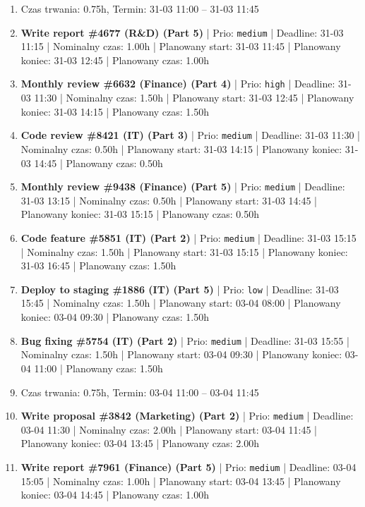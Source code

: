 {\begin{enumerate}
  \item [\textbf{PRZERWA}] Czas trwania: 0.75h, Termin: 31-03 11:00 -- 31-03 11:45
  \item [\textbf{14640}] \textbf{Write report \#4677 (R\&D) (Part 5)} | Prio: \texttt{medium} | Deadline: 31-03 11:15 | Nominalny czas: 1.00h | Planowany start: 31-03 11:45 | Planowany koniec: 31-03 12:45 | Planowany czas: 1.00h
  \item [\textbf{14615}] \textbf{Monthly review \#6632 (Finance) (Part 4)} | Prio: \texttt{high} | Deadline: 31-03 11:30 | Nominalny czas: 1.50h | Planowany start: 31-03 12:45 | Planowany koniec: 31-03 14:15 | Planowany czas: 1.50h
  \item [\textbf{14665}] \textbf{Code review \#8421 (IT) (Part 3)} | Prio: \texttt{medium} | Deadline: 31-03 11:30 | Nominalny czas: 0.50h | Planowany start: 31-03 14:15 | Planowany koniec: 31-03 14:45 | Planowany czas: 0.50h
  \item [\textbf{14656}] \textbf{Monthly review \#9438 (Finance) (Part 5)} | Prio: \texttt{medium} | Deadline: 31-03 13:15 | Nominalny czas: 0.50h | Planowany start: 31-03 14:45 | Planowany koniec: 31-03 15:15 | Planowany czas: 0.50h
  \item [\textbf{14643}] \textbf{Code feature \#5851 (IT) (Part 2)} | Prio: \texttt{medium} | Deadline: 31-03 15:15 | Nominalny czas: 1.50h | Planowany start: 31-03 15:15 | Planowany koniec: 31-03 16:45 | Planowany czas: 1.50h
  \item [\textbf{14697}] \textbf{Deploy to staging \#1886 (IT) (Part 5)} | Prio: \texttt{low} | Deadline: 31-03 15:45 | Nominalny czas: 1.50h | Planowany start: 03-04 08:00 | Planowany koniec: 03-04 09:30 | Planowany czas: 1.50h
  \item [\textbf{14631}] \textbf{Bug fixing \#5754 (IT) (Part 2)} | Prio: \texttt{medium} | Deadline: 31-03 15:55 | Nominalny czas: 1.50h | Planowany start: 03-04 09:30 | Planowany koniec: 03-04 11:00 | Planowany czas: 1.50h
  \item [\textbf{PRZERWA}] Czas trwania: 0.75h, Termin: 03-04 11:00 -- 03-04 11:45
  \item [\textbf{14673}] \textbf{Write proposal \#3842 (Marketing) (Part 2)} | Prio: \texttt{medium} | Deadline: 03-04 11:30 | Nominalny czas: 2.00h | Planowany start: 03-04 11:45 | Planowany koniec: 03-04 13:45 | Planowany czas: 2.00h
  \item [\textbf{14657}] \textbf{Write report \#7961 (Finance) (Part 5)} | Prio: \texttt{medium} | Deadline: 03-04 15:05 | Nominalny czas: 1.00h | Planowany start: 03-04 13:45 | Planowany koniec: 03-04 14:45 | Planowany czas: 1.00h

\end{enumerate}}

